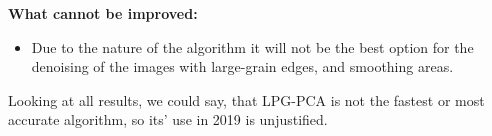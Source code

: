 \textbf{What cannot be improved:}
\begin{itemize}
    \item Due to the nature of the algorithm it will not be the best option for the denoising of the images with large-grain edges, and smoothing areas.
\end{itemize}

Looking at all results, we could say, that LPG-PCA is not the fastest or most accurate algorithm, so its’ use in 2019 is unjustified.




